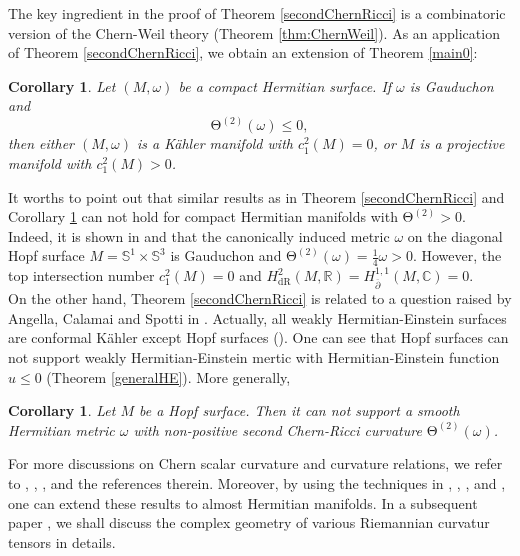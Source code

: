 \documentclass[12pt]{amsart}
\newcommand\bp{{\bar\partial}}
\theoremstyle{plain}
\newtheorem{cor}[thm]{Corollary}
\theoremstyle{definition}
\newcommand{\bcorollary}{\begin{cor}}
\newcommand{\ecorollary}{\end{cor}}
\renewcommand{\bar}{\overline}
\renewcommand{\bp}{\bar{\partial}}
\renewcommand{\S}{{\mathbb S}}
\renewcommand{\>}{\rightarrow}
\newcommand{\C}{{\mathbb C}}
\newcommand{\R}{{\mathbb R}}
\numberwithin{equation}{section} %
\begin{document}
\noindent The key ingredient in the proof of Theorem \ref{secondChernRicci} is a combinatoric version of the Chern-Weil theory (Theorem \ref{thm:ChernWeil}).  As an application of Theorem \ref{secondChernRicci}, we obtain an extension of Theorem \ref{main0}:

 	
	\bcorollary\label{surface}  Let $(M,\omega)$ be a compact Hermitian surface. If  $\omega$ is Gauduchon and  $$\mathrm{\Theta^{(2)}}(\omega)\leq 0,$$ then either  $(M,\omega)$ is a K\"ahler manifold with $c_1^2(M)=0$,  or $M$ is a projective manifold with $c_1^2(M)>0$.
	\ecorollary 
	
	
	
	\noindent It worths to point out that similar results as in Theorem \ref{secondChernRicci} and Corollary \ref{surface} can not hold for compact Hermitian manifolds with $\mathrm{\Theta^{(2)}}>0$.  Indeed,  it is shown in \cite[Proposition~6.1]{LiuYang2012} and \cite[Section~6]{LiuYang2017} that the canonically induced metric $\omega$ on the diagonal Hopf surface $M=\S^1\times \S^3$ is Gauduchon and  $\mathrm{\Theta^{(2)}}(\omega)=\frac{1}{4}\omega>0$. However,   the top intersection number $c_1^2(M)=0$ and $H^2_{\mathrm{dR}}(M,\R)=H^{1,1}_{\bp}(M,\C)=0$. \\
	
	
	\noindent  On the other hand, Theorem \ref{secondChernRicci} is related to a question raised by Angella, Calamai and Spotti  in \cite[Remark~13]{Angella2020}. Actually, all weakly Hermitian-Einstein  surfaces are conformal K\"ahler except Hopf surfaces (\cite[Theorem~2]{Gauduchon1997}).  One can see that Hopf surfaces can not support weakly Hermitian-Einstein mertic with  Hermitian-Einstein function $u\leq 0$ (Theorem \ref{generalHE}).  More generally, 
	
	
	
	\bcorollary\label{Hopf} Let $M$ be a Hopf surface. Then it can not support a smooth Hermitian metric $\omega$ with non-positive second Chern-Ricci curvature  $\mathrm{\Theta^{(2)}}(\omega)$.
	\ecorollary
	
	
	\noindent For more discussions on Chern scalar curvature and curvature relations,  we refer to \cite{Angella2017},  \cite{Chen2021}, 
	\cite{Chen2022},	\cite{Lejmi2018} and the references therein.
	Moreover,  by using the techniques in   \cite{Apostolov1999}, \cite{Chen2023}, \cite{Fu2022},  \cite{Li2010} and \cite{Tosatti2007}, one can  extend these results to almost Hermitian manifolds. In a subsequent paper \cite{Yang2024}, we shall discuss the complex geometry of various Riemannian curvatur tensors in details. \\
\end{document}
